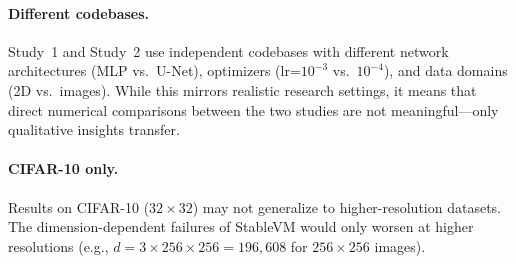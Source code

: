 \paragraph{Different codebases.} Study~1 and Study~2 use independent codebases with different network architectures (MLP vs.\ U-Net), optimizers (lr=$10^{-3}$ vs.\ $10^{-4}$), and data domains (2D vs.\ images). While this mirrors realistic research settings, it means that direct numerical comparisons between the two studies are not meaningful---only qualitative insights transfer.

\paragraph{CIFAR-10 only.} Results on CIFAR-10 ($32 \times 32$) may not generalize to higher-resolution datasets. The dimension-dependent failures of StableVM would only worsen at higher resolutions (e.g., $d = 3 \times 256 \times 256 = 196{,}608$ for $256 \times 256$ images).
